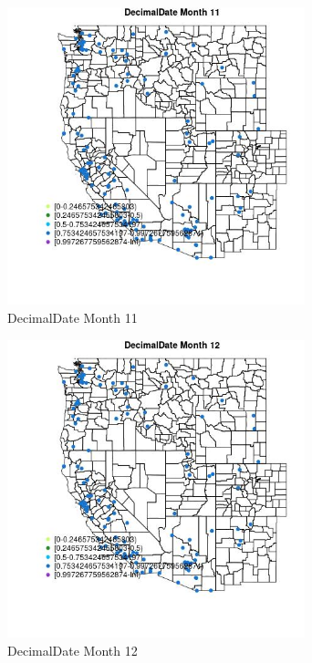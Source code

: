 \begin{figure} 
\centering  
\includegraphics[width=0.77\textwidth]{Code_Outputs/Report_ML_input_PM25_Step4_part_e_de_duplicated_aves_MapObsMo11DecimalDate.jpg} 
\caption{\label{fig:Report_ML_input_PM25_Step4_part_e_de_duplicated_avesMapObsMo11DecimalDate}DecimalDate Month 11} 
\end{figure} 
 

\begin{figure} 
\centering  
\includegraphics[width=0.77\textwidth]{Code_Outputs/Report_ML_input_PM25_Step4_part_e_de_duplicated_aves_MapObsMo12DecimalDate.jpg} 
\caption{\label{fig:Report_ML_input_PM25_Step4_part_e_de_duplicated_avesMapObsMo12DecimalDate}DecimalDate Month 12} 
\end{figure} 
 
